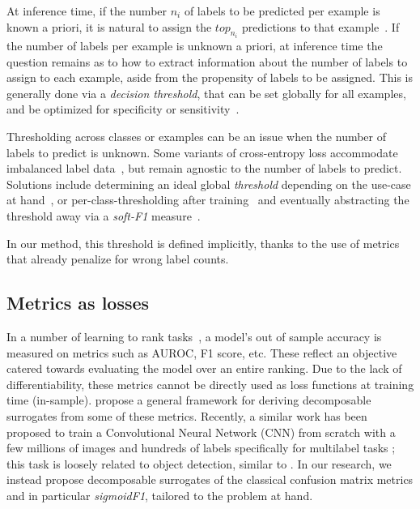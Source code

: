 At inference time, if the number $n_i$ of labels to be predicted per example is known a priori, it is natural to assign the $top_{n_i}$ predictions to that example~\cite{lossTopKError, topKmulticlassSVM}.
If the number of labels per example is unknown a priori,  at inference time the question remains as to how to extract information about the number of labels to assign to each example, aside from the propensity of labels to be assigned.
This is generally done via a \emph{decision threshold}, that can be set globally for all examples, and be optimized for specificity or sensitivity~\cite{decisionThreshold}.

Thresholding across classes or examples can be an issue when the number of labels to predict is unknown. Some variants of cross-entropy loss accommodate imbalanced label data~\cite{focalLoss}, but remain agnostic to the number of labels to predict.
Solutions include determining an ideal global \emph{threshold} depending on the use-case at hand~\cite{threshForF1}, or per-class-thresholding after training~\cite{moviePosters} and eventually abstracting the threshold away via a \emph{soft-F1} measure~\cite{softF1}.

In our method, this threshold is defined implicitly, thanks to the use of metrics that already penalize for
wrong label counts.


\subsection{Metrics as losses}

In a number of learning to rank tasks~\cite{LTR}, a model's out of sample accuracy is measured on metrics such as AUROC, F1 score, etc. These reflect an objective catered towards evaluating the model over an entire ranking. Due to the lack of differentiability, these metrics cannot be directly used as loss
functions at training time (in-sample). \citet{optimizableLosses} propose a general framework for deriving
decomposable surrogates from some of these metrics.
Recently, a similar work has been proposed to train a Convolutional
Neural Network (CNN) from scratch with a few millions of images and hundreds
of labels specifically for multilabel tasks \cite{tencent}; this task is loosely related to object detection, similar to \cite{multitaskLabelImages}.
In our research, we instead propose decomposable surrogates of the classical confusion matrix metrics and in particular \emph{sigmoidF1}, tailored to the problem at hand.


